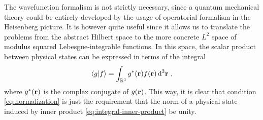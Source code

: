             The wavefunction formalism is not strictly necessary, since a quantum mechanical theory could be entirely developed by the usage of operatorial formalism in the Heisenberg picture. It is however quite useful since it allows us to translate the problems from the abstract Hilbert space to the more concrete $L^2$ space of modulus squared Lebesgue-integrable functions. In this space, the scalar product between physical states can be expressed in terms of the integral
            \begin{equation}
                \label{eq:integral-inner-product}
                \braket{g}{f} = \int\nolimits_{\bbR^3}g^*\pqty{\vb{r}} f\pqty{\vb{r}} \dd[3]{\vb{r}}
                \mycomma
            \end{equation}
            where $g^*\pqty{\vb{r}}$ is the complex conjugate of $g\pqty{\vb{r}}$. This way, it is clear that condition \eqref{eq:normalization} is just the requirement that the norm of a physical state induced by inner product \eqref{eq:integral-inner-product} be unity.

